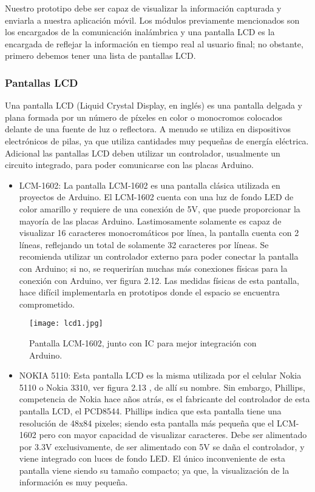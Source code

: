 \par \noindent
Nuestro prototipo debe ser capaz de visualizar la información capturada y enviarla a nuestra aplicación móvil. 
Los módulos previamente mencionados son los encargados de la comunicación inalámbrica y una pantalla LCD es la encargada de reflejar la información en tiempo real al usuario final; no obstante, primero debemos tener una lista de pantallas LCD.

\subsubsection{Pantallas LCD}

Una pantalla LCD (Liquid Crystal Display, en inglés) es una pantalla delgada y plana formada por un número de píxeles en color o monocromos colocados delante de una fuente de luz o reflectora. A menudo se utiliza en dispositivos electrónicos de pilas, ya que utiliza cantidades muy pequeñas de energía eléctrica\cite{lcd}. Adicional las pantallas LCD deben utilizar un controlador, usualmente un circuito integrado, para poder comunicarse con las placas Arduino. 

\begin{itemize}
	\item LCM-1602: La pantalla LCM-1602 es una pantalla clásica utilizada en proyectos de Arduino. El LCM-1602 cuenta con una luz de fondo LED de color amarillo y requiere de una conexión de 5V, que puede proporcionar la mayoría de las placas Arduino. Lastimosamente solamente es capaz de visualizar 16 caracteres monocromáticos por línea, la pantalla cuenta con 2 líneas, reflejando un total de solamente 32 caracteres por líneas\cite{lcm}. Se recomienda utilizar un controlador externo para poder conectar la pantalla con Arduino; si no, se requerirían muchas más conexiones físicas para la conexión con Arduino, ver figura 2.12. Las medidas físicas de esta pantalla, hace difícil implementarla en prototipos donde el espacio se encuentra comprometido.
\end{itemize}

\begin{figure}[H]
	\centering
	\texttt{[image: lcd1.jpg]}
	\caption{Pantalla LCM-1602, junto con IC para mejor integración con Arduino.}
\end{figure}

\begin{itemize}
	\item NOKIA 5110: Esta pantalla LCD es la misma utilizada por el celular Nokia 5110 o Nokia 3310, ver figura 2.13 , de allí su nombre\cite{nokia1}. 
	Sin embargo, Phillips, competencia de Nokia hace años atrás, es el fabricante del controlador de esta pantalla LCD, el PCD8544. Phillips indica que esta pantalla tiene una resolución de 48x84 pixeles; siendo esta pantalla más pequeña que el LCM-1602 pero con mayor capacidad de visualizar caracteres\cite{nokia2}. Debe ser alimentado por 3.3V exclusivamente, de ser alimentado con 5V se daña el controlador, y viene integrado con luces de fondo LED\cite{nokia2}. El único inconveniente de esta pantalla viene siendo su tamaño compacto; ya que, la visualización de la información es muy pequeña.
\end{itemize}

